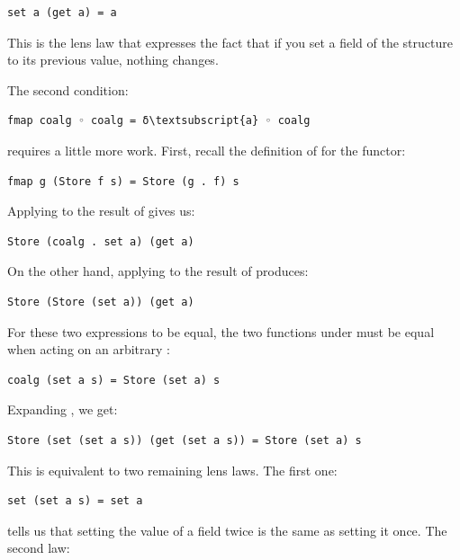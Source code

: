 \begin{Verbatim}[commandchars=\\\{\}]
set a (get a) = a
\end{Verbatim}
This is the lens law that expresses the fact that if you set a field of
the structure  to its previous value, nothing changes.

The second condition:

\begin{Verbatim}[commandchars=\\\{\}]
fmap coalg ◦ coalg = δ\textsubscript{a} ◦ coalg
\end{Verbatim}
requires a little more work. First, recall the definition of
 for the  functor:

\begin{Verbatim}[commandchars=\\\{\}]
fmap g (Store f s) = Store (g . f) s
\end{Verbatim}
Applying  to the result of  gives us:

\begin{Verbatim}[commandchars=\\\{\}]
Store (coalg . set a) (get a)
\end{Verbatim}
On the other hand, applying  to the result of
 produces:

\begin{Verbatim}[commandchars=\\\{\}]
Store (Store (set a)) (get a)
\end{Verbatim}
For these two expressions to be equal, the two functions under
 must be equal when acting on an arbitrary :

\begin{Verbatim}[commandchars=\\\{\}]
coalg (set a s) = Store (set a) s
\end{Verbatim}
Expanding , we get:

\begin{Verbatim}[commandchars=\\\{\}]
Store (set (set a s)) (get (set a s)) = Store (set a) s
\end{Verbatim}
This is equivalent to two remaining lens laws. The first one:

\begin{Verbatim}[commandchars=\\\{\}]
set (set a s) = set a
\end{Verbatim}
tells us that setting the value of a field twice is the same as setting
it once. The second law:

